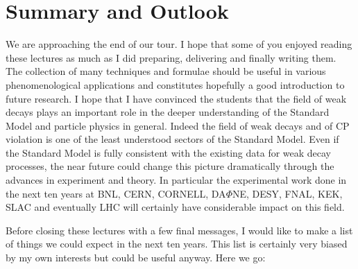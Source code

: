 \section{Summary and Outlook}
\setcounter{equation}{0}
We are approaching the end of our tour. I hope that some of you
enjoyed reading these  lectures as much as I did preparing,
delivering and finally writing them.
The collection of many techniques and formulae should be useful
in various phenomenological applications and constitutes hopefully
a good introduction to future research.
I hope that I have convinced the students that the field of weak decays
plays an important 
role in the deeper understanding of the Standard Model 
and particle physics in general.
Indeed the field of weak decays and of CP violation is one of the least
understood sectors of the Standard Model.
Even if the Standard Model is fully consistent with the existing data for
weak decay processes, the near future could change 
this picture
dramatically through the advances in experiment and theory.
In particular the experimental work
done in the next ten
years at BNL, CERN, CORNELL, DA$\Phi$NE, DESY, 
FNAL, KEK, SLAC and eventually LHC will certainly 
have considerable impact on this field.

Before closing these lectures with a few final messages, I would
like to make a list of things we could expect in the next ten years.
This list is certainly very biased by my own interests but could
be useful anyway. Here we go:

